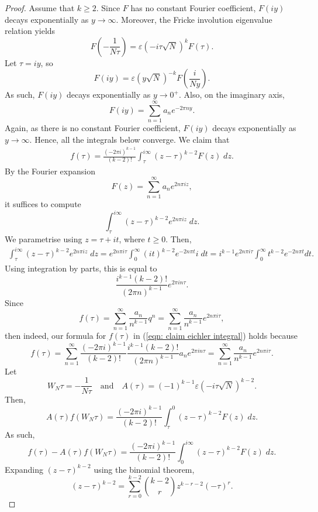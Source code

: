 \documentclass[12pt, a4paper]{amsart}
\theoremstyle{definition}
\numberwithin{theorem}{section}
\begin{document}
\begin{proof}
 Assume that $k\ge 2$. Since $F$ has no constant Fourier coefficient, $F\left(iy\right)$ decays exponentially as $y\to\infty$. Moreover, the Fricke involution eigenvalue relation \cite{Miyake2006} yields
 \[F\left(-\frac{1}{N\tau}\right)=\varepsilon\left(-i\tau\sqrt{N}\right)^kF\left(\tau\right).\]
 Let $\tau=iy$, so
 \[F\left(iy\right)=\varepsilon\left(y\sqrt{N}\right)^{-k}F\left(\frac{i}{Ny}\right).\]
 As such, $F\left(iy\right)$ decays exponentially as $y\to0^+$. Also, on the imaginary axis, \[F\left(iy\right)=\sum_{n=1}^{\infty}a_ne^{-2\pi n y}.\]
 Again, as there is no constant Fourier coefficient, $F\left(iy\right)$ decays exponentially as $y\to\infty$. Hence, all the integrals below converge. We claim that \begin{align}\label{eqn: claim eichler integral}
    f\left(\tau\right)=\frac{\left(-2\pi i\right)^{k-1}}{\left(k-2\right)!}\int_{\tau}^{i\infty}\left(z-\tau\right)^{k-2}F\left(z\right)\;dz.
 \end{align} 
By the Fourier expansion \[F\left(z\right)=\sum_{n=1}^{\infty}a_ne^{2n\pi iz},\]
it suffices to compute \[\int_{\tau}^{i\infty}\left(z-\tau\right)^{k-2}e^{2n\pi iz}\;dz.\]
We parametrise using $z=\tau + it$, where $t\ge 0$. Then, \begin{align*}
    \int_{\tau}^{i\infty}\left(z-\tau\right)^{k-2}e^{2n\pi iz}\;dz=e^{2n\pi i\tau}\int_{0}^{\infty}\left(it\right)^{k-2}e^{-2n\pi t}i\;dt=i^{k-1}e^{2n\pi i\tau}\int_{0}^{\infty}t^{k-2}e^{-2n\pi t}dt.
\end{align*}
Using integration by parts, this is equal to \[\frac{i^{k-1}\left(k-2\right)!}{\left(2\pi n\right)^{k-1}}e^{2\pi in\tau}.\]
Since \[f\left(\tau\right)=\sum_{n=1}^{\infty}\frac{a_n}{n^{k-1}}q^n=\sum_{n=1}^{\infty}\frac{a_n}{n^{k-1}}e^{2n\pi i\tau},\]
then indeed, our formula for $f\left(\tau\right)$ in (\ref{eqn: claim eichler integral}) holds because \[f\left(\tau\right)=\sum_{n=1}^{\infty}\frac{\left(-2\pi i\right)^{k-1}}{\left(k-2\right)!}\frac{i^{k-1}\left(k-2\right)!}{\left(2\pi n\right)^{k-1}}a_ne^{2\pi in\tau}=\sum_{n=1}^{\infty}\frac{a_n}{n^{k-1}}e^{2n\pi i\tau}.\]
Let
\[W_N\tau=-\frac{1}{N\tau}\quad\text{and}\quad A\left(\tau\right)=\left(-1\right)^{k-1}\varepsilon\left(-i\tau\sqrt{N}\right)^{k-2}.\] 
Then, \[A\left(\tau\right)f\left(W_N\tau\right)=\frac{\left(-2\pi i\right)^{k-1}}{\left(k-2\right)!}\int_{\tau}^{0}\left(z-\tau\right)^{k-2}F\left(z\right)\;dz.\] As such, \[f\left(\tau\right)-A\left(\tau\right)f\left(W_N\tau\right)=\frac{\left(-2\pi i\right)^{k-1}}{\left(k-2\right)!}\int_{0}^{i\infty}\left(z-\tau\right)^{k-2}F\left(z\right)\;dz.\] Expanding $\left(z-\tau\right)^{k-2}$ using the binomial theorem, \[\left(z-\tau\right)^{k-2}=\sum_{r=0}^{k-2}\binom{k-2}{r}z^{k-r-2}\left(-\tau\right)^r.\]

\end{proof}
\end{document}
